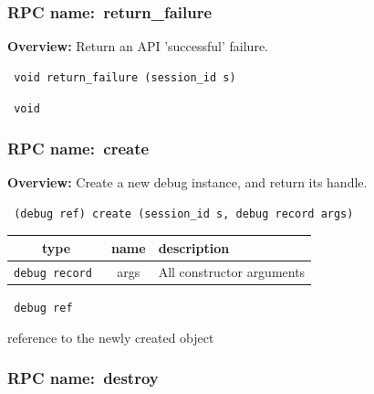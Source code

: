 \subsubsection{RPC name:~return\_failure}

{\bf Overview:} 
Return an API 'successful' failure.

\begin{verbatim} void return_failure (session_id s)\end{verbatim}


\vspace{0.3cm}

{\tt 
void
}



\vspace{0.3cm}
\vspace{0.3cm}
\vspace{0.3cm}
\subsubsection{RPC name:~create}

{\bf Overview:} 
Create a new debug instance, and return its handle.

\begin{verbatim} (debug ref) create (session_id s, debug record args)\end{verbatim}



 
\vspace{0.3cm}
\begin{tabular}{|c|c|p{7cm}|}
 \hline
{\bf type} & {\bf name} & {\bf description} \\ \hline
{\tt debug record } & args & All constructor arguments \\ \hline 

\end{tabular}

\vspace{0.3cm}

{\tt 
debug ref
}


reference to the newly created object
\vspace{0.3cm}
\vspace{0.3cm}
\vspace{0.3cm}
\subsubsection{RPC name:~destroy}

